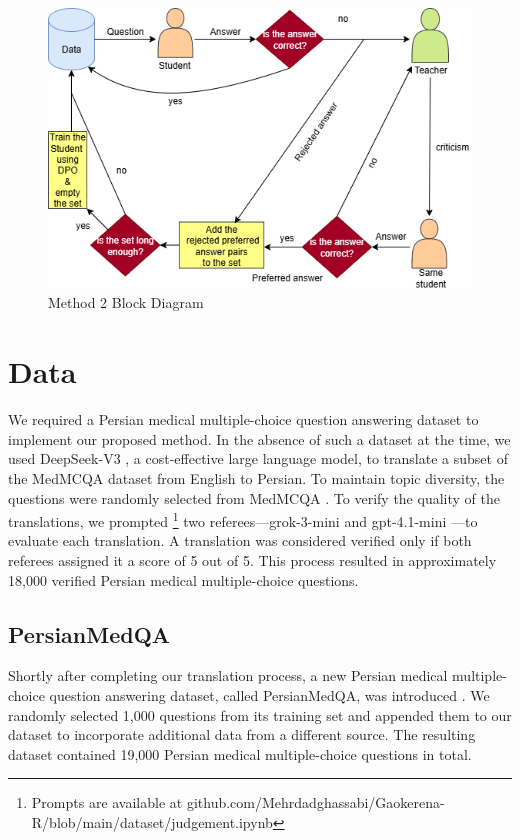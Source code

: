 \documentclass[conference]{IEEEtran}
\begin{document}
\begin{figure}[h]
    \centering
    \includegraphics[width=1.0\linewidth]{fig2.png}
    \caption{Method 2 Block Diagram}
    \label{fig2}
\end{figure}


         \section{Data}
We required a Persian medical multiple-choice question answering dataset to implement our proposed method.  
In the absence of such a dataset at the time, we used DeepSeek-V3
\cite{b19}, a cost-effective large language model, to translate a subset of the MedMCQA dataset from English to Persian.  
To maintain topic diversity, the questions were randomly selected from MedMCQA
\cite{b20}.  
To verify the quality of the translations, we prompted
\footnote{Prompts are available at github.com/Mehrdadghassabi/Gaokerena-R/blob/main/dataset/judgement.ipynb}
 two referees—grok-3-mini
\cite{b21} and gpt-4.1-mini
\cite{b22}—to evaluate each translation.  
A translation was considered verified only if both referees assigned it a score of 5 out of 5.  
This process resulted in approximately 18,000 verified Persian medical multiple-choice questions.

         \subsection{PersianMedQA}
Shortly after completing our translation process, a new Persian medical multiple-choice question answering dataset, called PersianMedQA, was introduced
\cite{b23}.  
We randomly selected 1,000 questions from its training set and appended them to our dataset to incorporate additional data from a different source.  
The resulting dataset contained 19,000 Persian medical multiple-choice questions in total.
\end{document}
